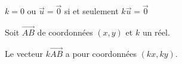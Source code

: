 \begin{Rq}
$k=0$ ou $\vec{u}=\vec{0}$ si et seulement $k\vec{u}=\vec{0}$
\end{Rq}


\begin{Th}
Soit $\overrightarrow{AB}$ de coordonnées $(x,y)$ et $k$ un réel.

Le vecteur  $k\overrightarrow{AB}$ a pour coordonnées $(kx,ky)$.
\end{Th}



